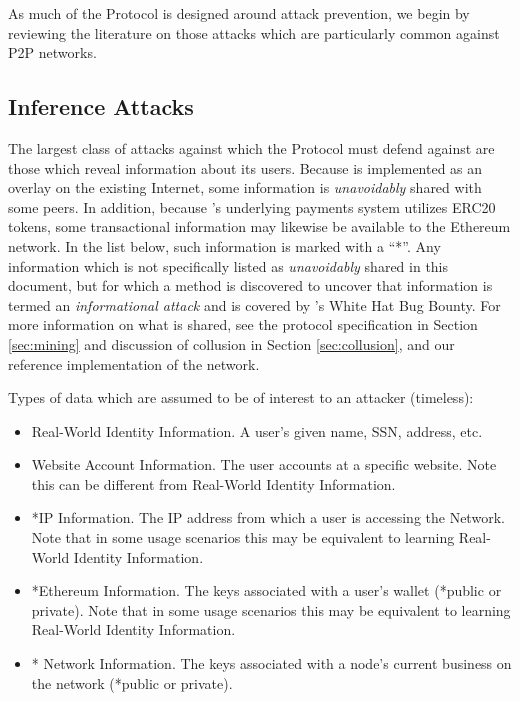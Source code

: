 
As much of the \Orchid{} Protocol is designed around attack prevention, we begin by reviewing
the literature on those attacks which are particularly common against
P2P networks.

\subsection*{Inference Attacks}
\label{inference-attacks}

The largest class of attacks against which the \Orchid{} Protocol must defend against are those which reveal information about its users. Because \Orchid{} is implemented as an overlay on the existing Internet, some information is \emph{unavoidably} shared with some peers.  In addition, because \Orchid{}'s underlying payments system utilizes ERC20 tokens, some transactional information may likewise be available to the Ethereum network. In the list below, such information is marked with a “*”. Any information which is not specifically listed as \emph{unavoidably} shared in this document, but for which a method is discovered to uncover that information is termed an \emph{informational attack} and is covered by \Orchid’s White Hat Bug Bounty. For more information on what is shared, see the protocol specification in Section \ref{sec:mining} and discussion of collusion in Section \ref{sec:collusion}, and our reference implementation of the network\cite{oursoftware}.

Types of data which are assumed to be of interest to an attacker (timeless):

\begin{itemize}
\item Real-World Identity Information. A user’s given name, SSN, address, etc.
\item Website Account Information. The user accounts at a specific website. Note this can be different from Real-World Identity Information.
\item *IP Information. The IP address from which a user is accessing the \Orchid{} Network. Note that in some usage scenarios this may be equivalent to learning Real-World Identity Information.
\item *Ethereum Information. The keys associated with a user’s wallet (*public or private). Note that in some usage scenarios this may be equivalent to learning Real-World Identity Information.
\item *\Orchid{} Network Information. The keys associated with a node’s current business on the \Orchid{} network (*public or private).
\end{itemize}

